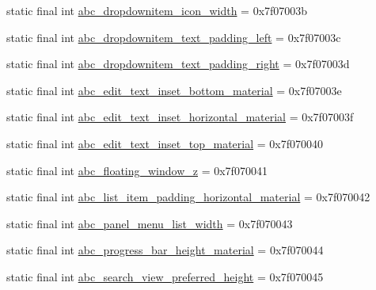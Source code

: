 \begin{CompactItemize}
\item 
static final int \hyperlink{classandroid_1_1support_1_1graphics_1_1drawable_1_1animated_1_1_r_1_1dimen_cd27479919dcd0eda642d1548c063c91}{abc\_\-dropdownitem\_\-icon\_\-width} = 0x7f07003b
\item 
static final int \hyperlink{classandroid_1_1support_1_1graphics_1_1drawable_1_1animated_1_1_r_1_1dimen_3381cc35a2737477762415a900e8ab5e}{abc\_\-dropdownitem\_\-text\_\-padding\_\-left} = 0x7f07003c
\item 
static final int \hyperlink{classandroid_1_1support_1_1graphics_1_1drawable_1_1animated_1_1_r_1_1dimen_89839956a9b2473e3da014192c6eae15}{abc\_\-dropdownitem\_\-text\_\-padding\_\-right} = 0x7f07003d
\item 
static final int \hyperlink{classandroid_1_1support_1_1graphics_1_1drawable_1_1animated_1_1_r_1_1dimen_9ae7f474a2b0b25923ce75aa209cce64}{abc\_\-edit\_\-text\_\-inset\_\-bottom\_\-material} = 0x7f07003e
\item 
static final int \hyperlink{classandroid_1_1support_1_1graphics_1_1drawable_1_1animated_1_1_r_1_1dimen_878fae0d86a7759c116e863fdd755411}{abc\_\-edit\_\-text\_\-inset\_\-horizontal\_\-material} = 0x7f07003f
\item 
static final int \hyperlink{classandroid_1_1support_1_1graphics_1_1drawable_1_1animated_1_1_r_1_1dimen_1fd820c0fd8f4505636e2dee50498bff}{abc\_\-edit\_\-text\_\-inset\_\-top\_\-material} = 0x7f070040
\item 
static final int \hyperlink{classandroid_1_1support_1_1graphics_1_1drawable_1_1animated_1_1_r_1_1dimen_0ec79a0c1a3622f17065290e44262deb}{abc\_\-floating\_\-window\_\-z} = 0x7f070041
\item 
static final int \hyperlink{classandroid_1_1support_1_1graphics_1_1drawable_1_1animated_1_1_r_1_1dimen_d8f63367b5b75ec3651936f39a8315e7}{abc\_\-list\_\-item\_\-padding\_\-horizontal\_\-material} = 0x7f070042
\item 
static final int \hyperlink{classandroid_1_1support_1_1graphics_1_1drawable_1_1animated_1_1_r_1_1dimen_3609cad8e837f65ac22b45562b6e1c0b}{abc\_\-panel\_\-menu\_\-list\_\-width} = 0x7f070043
\item 
static final int \hyperlink{classandroid_1_1support_1_1graphics_1_1drawable_1_1animated_1_1_r_1_1dimen_61a72304a9c9d6d1827709c02eaa6c02}{abc\_\-progress\_\-bar\_\-height\_\-material} = 0x7f070044
\item 
static final int \hyperlink{classandroid_1_1support_1_1graphics_1_1drawable_1_1animated_1_1_r_1_1dimen_e205d37db6eb38dadc2b633d15df2654}{abc\_\-search\_\-view\_\-preferred\_\-height} = 0x7f070045

\end{CompactItemize}
